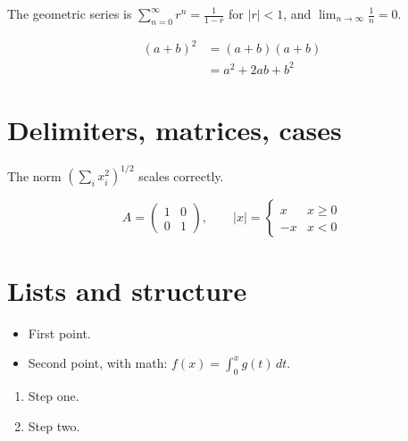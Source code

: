 \documentclass{article}
\begin{document}
The geometric series is $\sum_{n=0}^{\infty} r^n = \frac{1}{1 - r}$ for
$|r| < 1$, and $\lim_{n \to \infty} \frac{1}{n} = 0$.

\begin{align}
    (a + b)^2 &= (a + b)(a + b)          \\
              &= a^2 + 2ab + b^2
\end{align}

\section{Delimiters, matrices, cases}

The norm $\left( \sum_i x_i^2 \right)^{1/2}$ scales correctly.

\[
    A = \begin{pmatrix} 1 & 0 \\ 0 & 1 \end{pmatrix},
    \qquad
    |x| = \begin{cases}
        x  & x \geq 0 \\
        -x & x < 0
    \end{cases}
\]

\section{Lists and structure}

\begin{itemize}
    \item First point.
    \item Second point, with math: $f(x) = \int_0^x g(t)\, dt$.
\end{itemize}

\begin{enumerate}
    \item Step one.
    \item Step two.
\end{enumerate}
\end{document}

